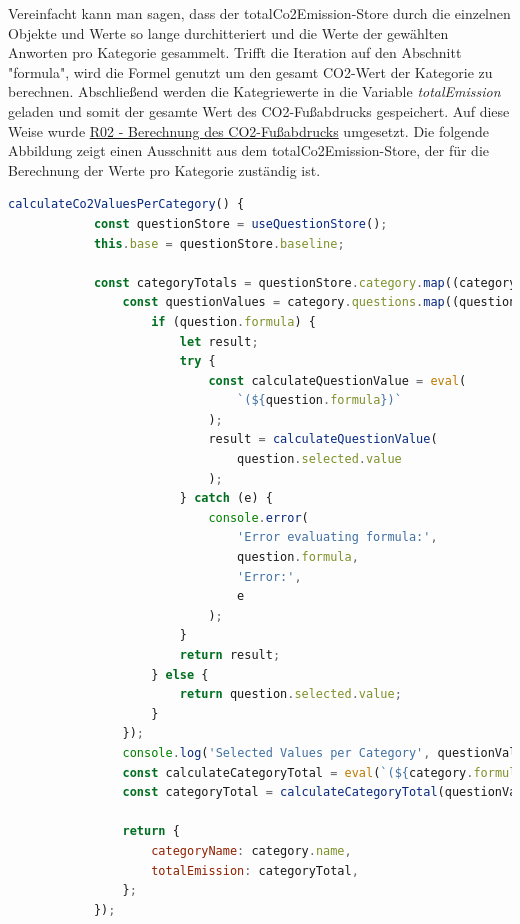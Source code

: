 Vereinfacht kann man sagen, dass der totalCo2Emission-Store durch die einzelnen Objekte und Werte so lange durchitteriert und die Werte der gewählten Anworten pro Kategorie gesammelt.
Trifft die Iteration auf den Abschnitt "formula", wird die Formel genutzt um den gesamt CO2-Wert der Kategorie zu berechnen.
Abschließend werden die Kategriewerte in die Variable \textit{totalEmission} geladen und somit der gesamte Wert des CO2-Fußabdrucks gespeichert.
Auf diese Weise wurde \hyperref[sec:berechnung-des-co2abdrucks]{R02 - Berechnung des CO2-Fußabdrucks} umgesetzt.
Die folgende Abbildung zeigt einen Ausschnitt aus dem totalCo2Emission-Store, der für die Berechnung der Werte pro Kategorie zuständig ist. \newpage
\begin{lstlisting}[language={JavaScript}, caption={Ausschnitt aus dem totalCo2Emission.ts - Store}]
    calculateCo2ValuesPerCategory() {
            const questionStore = useQuestionStore();
            this.base = questionStore.baseline;

            const categoryTotals = questionStore.category.map((category) => {
                const questionValues = category.questions.map((question) => {
                    if (question.formula) {
                        let result;
                        try {
                            const calculateQuestionValue = eval(
                                `(${question.formula})`
                            );
                            result = calculateQuestionValue(
                                question.selected.value
                            );
                        } catch (e) {
                            console.error(
                                'Error evaluating formula:',
                                question.formula,
                                'Error:',
                                e
                            );
                        }
                        return result;
                    } else {
                        return question.selected.value;
                    }
                });
                console.log('Selected Values per Category', questionValues);
                const calculateCategoryTotal = eval(`(${category.formula})`);
                const categoryTotal = calculateCategoryTotal(questionValues);

                return {
                    categoryName: category.name,
                    totalEmission: categoryTotal,
                };
            });
\end{lstlisting}

